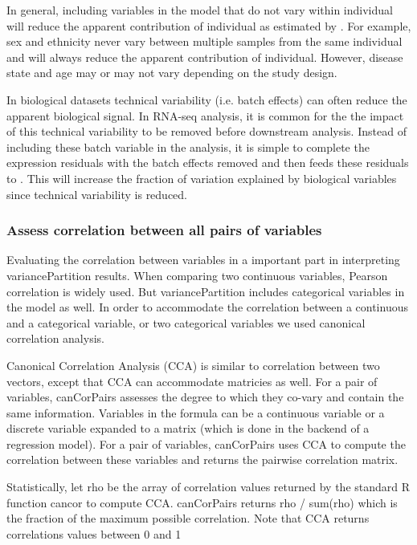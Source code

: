 \documentclass[12pt]{article}\usepackage[]{graphicx}\usepackage[]{xcolor}
\begin{document}
In general, including variables in the model that do not vary within individual will reduce the apparent contribution of individual as estimated by .  For example, sex and ethnicity never vary between multiple samples from the same individual and will always reduce the apparent contribution of individual.  However, disease state and age may or may not vary depending on the study design.

In biological datasets technical variability (i.e. batch effects) can often reduce the apparent biological signal.  In RNA-seq analysis, it is common for the the impact of this technical variability to be removed before downstream analysis.  Instead of including these batch variable in the  analysis, it is simple to complete the expression residuals with the batch effects removed and then feeds these residuals to .  This will increase the fraction of variation explained by biological variables since technical variability is reduced.



\subsubsection{Assess correlation between all pairs of variables}
\label{sec:canCor}

Evaluating the correlation between variables in a important part in interpreting variancePartition results.  When comparing two continuous variables, Pearson correlation is widely used.  But variancePartition includes categorical variables in the model as well.  In order to accommodate the correlation between a continuous and a categorical variable, or two categorical variables we used canonical correlation analysis.  

Canonical Correlation Analysis (CCA) is similar to correlation between two vectors, except that CCA can accommodate matricies as well.  For a pair of variables, canCorPairs assesses the degree to which they co-vary and contain the same information.  Variables in the formula can be a continuous variable or a discrete variable expanded to a matrix (which is done in the backend of a regression model).  For a pair of variables, canCorPairs uses CCA to compute the correlation between these variables and returns the pairwise correlation matrix.

Statistically, let rho be the array of correlation values returned by the standard R function cancor to compute CCA.  canCorPairs returns rho / sum(rho) which is the fraction of the maximum possible correlation. Note that CCA returns correlations values between 0 and 1
\end{document}
